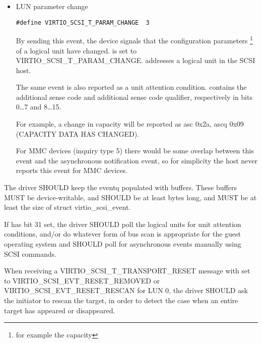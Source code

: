 \begin{itemize}
  \item LUN parameter change
\begin{lstlisting}
#define VIRTIO_SCSI_T_PARAM_CHANGE  3
\end{lstlisting}

  By sending this event, the device signals that the configuration parameters
  \footnote{for example the capacity} of a logical unit have changed.
   is set to VIRTIO_SCSI_T_PARAM_CHANGE.
   addresses a logical unit in the SCSI host.

  The same event is also reported as a unit attention condition.
   contains the additional sense code and additional sense code qualifier,
  respectively in bits 0\ldots 7 and 8\ldots 15.
  \begin{note}
  For example, a change in capacity will be reported as asc 0x2a, ascq 0x09
  (CAPACITY DATA HAS CHANGED).
  \end{note}

  For MMC devices (inquiry type 5) there would be some overlap between this
  event and the asynchronous notification event, so for simplicity the host never
  reports this event for MMC devices.
\end{itemize}


The driver SHOULD keep the eventq populated with buffers.  These
buffers MUST be device-writable, and SHOULD be at least
 bytes long, and MUST be at least the size of
struct virtio_scsi_event.

If  has bit 31 set, the driver SHOULD
poll the logical units for unit attention conditions, and/or do
whatever form of bus scan is appropriate for the guest operating
system and SHOULD poll for asynchronous events manually using SCSI commands.

When receiving a VIRTIO_SCSI_T_TRANSPORT_RESET message with
 set to VIRTIO_SCSI_EVT_RESET_REMOVED or
VIRTIO_SCSI_EVT_RESET_RESCAN for LUN 0, the driver SHOULD ask the
initiator to rescan the target, in order to detect the case when an
entire target has appeared or disappeared.


